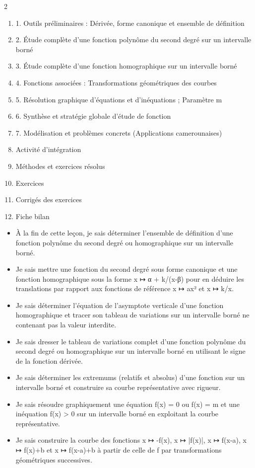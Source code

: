 \documentclass[11pt]{article}
\begin{document}
\begin{sommaire}
\begin{multicols}{2}
\begin{enumerate}
\item 1. Outils préliminaires : Dérivée, forme canonique et ensemble de définition
\item 2. Étude complète d'une fonction polynôme du second degré sur un intervalle borné
\item 3. Étude complète d'une fonction homographique sur un intervalle borné
\item 4. Fonctions associées : Transformations géométriques des courbes
\item 5. Résolution graphique d'équations et d'inéquations ; Paramètre m
\item 6. Synthèse et stratégie globale d'étude de fonction
\item 7. Modélisation et problèmes concrets (Applications camerounaises)
\item Activité d'intégration
\item Méthodes et exercices résolus
\item Exercices
\item Corrigés des exercices
\item Fiche bilan
\end{enumerate}
\end{multicols}
\end{sommaire}

\begin{objectifs}
\begin{itemize}
\item À la fin de cette leçon, je sais déterminer l'ensemble de définition d'une fonction polynôme du second degré ou homographique sur un intervalle borné.
\item Je sais mettre une fonction du second degré sous forme canonique et une fonction homographique sous la forme x ↦ α + k/(x-β) pour en déduire les translations par rapport aux fonctions de référence x ↦ ax² et x ↦ k/x.
\item Je sais déterminer l'équation de l'asymptote verticale d'une fonction homographique et tracer son tableau de variations sur un intervalle borné ne contenant pas la valeur interdite.
\item Je sais dresser le tableau de variations complet d'une fonction polynôme du second degré ou homographique sur un intervalle borné en utilisant le signe de la fonction dérivée.
\item Je sais déterminer les extremums (relatifs et absolus) d'une fonction sur un intervalle borné et construire sa courbe représentative avec rigueur.
\item Je sais résoudre graphiquement une équation f(x) = 0 ou f(x) = m et une inéquation f(x) > 0 sur un intervalle borné en exploitant la courbe représentative.
\item Je sais construire la courbe des fonctions x ↦ -f(x), x ↦ |f(x)|, x ↦ f(x-a), x ↦ f(x)+b et x ↦ f(x-a)+b à partir de celle de f par transformations géométriques successives.
\end{itemize}
\end{objectifs}
\end{document}
